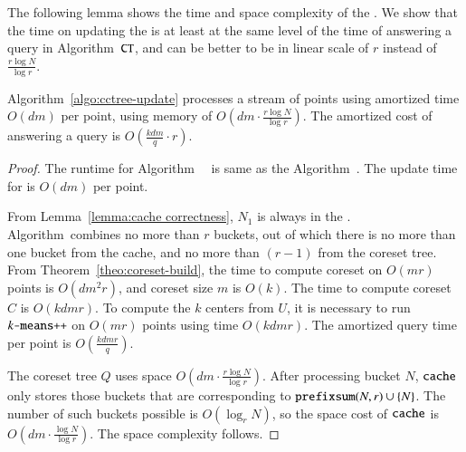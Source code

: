 The following lemma shows the time and space complexity of the \cache. 
We show that the time on updating the \cache is at least at the same level of 
the time of answering a query in Algorithm~$\texttt{CT}$, and can be better to be in linear
scale of $r$ instead of $\frac{r \log N}{\log r}$.
\begin{lemma}
\label{lemma:cctree-time}
Algorithm~\ref{algo:cctree-update} processes a stream of points 
using amortized time $O(dm)$ per point, 
using memory of $O\left(dm \cdot \frac{r \log N}{\log r} \right)$. 
The amortized cost of answering a query is $O\left(\frac{kdm}{q} \cdot r \right)$.
\end{lemma}

\begin{proof}
The runtime for Algorithm~\ccupdate~ is same as the Algorithm~\ctupdate. 
The update time for \ccupdate is $O(dm)$ per point.

From Lemma~\ref{lemma:cache correctness}, $N_1$ is always in the \cache. 
Algorithm~\cccoreset combines no more than $r$ buckets, 
out of which there is no more than one bucket from the cache, 
and no more than $(r-1)$ from the coreset tree. 
From Theorem~\ref{theo:coreset-build}, the time to compute coreset 
on $O(mr)$ points is $O(d m^2 r)$, and coreset size $m$ is $O(k)$.
The time to compute coreset $C$ is $O(kdmr)$.   
To compute the $k$ centers from $U$, 
it is necessary to run $\texttt{$k$-means++}$ on $O(mr)$ points using time $O(kdmr)$. 
The amortized query time per point is $O\left( \frac{kdmr}{q} \right)$.


The coreset tree $Q$ uses space $O\left( dm \cdot \frac{r \log N}{\log r} \right)$. 
After processing bucket $N$, $\texttt{cache}$ only stores those buckets that are 
corresponding to $\texttt{prefixsum}(N,r) \cup \{ N \}$. 
The number of such buckets possible is $O(\log_r N )$, 
so the space cost of $\texttt{cache}$ is $O(dm \cdot \frac{\log N}{\log r})$. 
The space complexity follows.
\end{proof}

